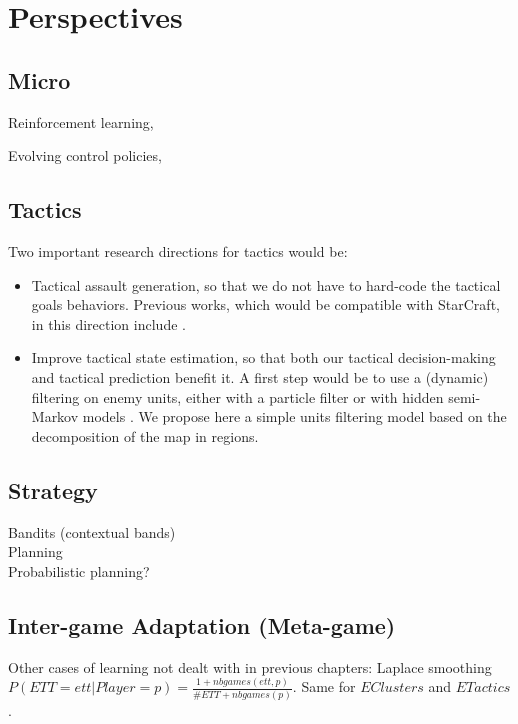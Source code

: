 \section{Perspectives}
\label{chapter:perspectives}
\subsection{Micro}

Reinforcement learning, \citep{Marthi05concurrenthierarchical}


Evolving control policies, \citep{Miles2007}
\subsection{Tactics}

Two important research directions for tactics would be:
\begin{itemize}
    \item Tactical assault generation, so that we do not have to hard-code the tactical goals behaviors. Previous works, which would be compatible with StarCraft, in this direction include \citep{Chung05,PonsenMSA06,UCT,GellySchoenauer}.
    \item Improve tactical state estimation, so that both our tactical decision-making and tactical prediction benefit it. A first step would be to use a (dynamic) filtering on enemy units, either with a particle filter \citep{Thrun02d,weber2011aiide} or with hidden semi-Markov models \citep{Hladky_anevaluation}. We propose here a simple units filtering model based on the decomposition of the map in regions.
\end{itemize}


\subsection{Strategy}
Bandits (contextual bands)\\
Planning \citep{Wolfe11}\\
Probabilistic planning?

\subsection{Inter-game Adaptation (Meta-game)}

Other cases of learning not dealt with in previous chapters:
\citep{metalevelbehavioradaptrts}
Laplace smoothing $P(ETT=ett|Player=p)= \frac{1 + nbgames(ett,p)}{\#ETT + nbgames(p)}$. Same for $EClusters$ and $ETactics$.\\

